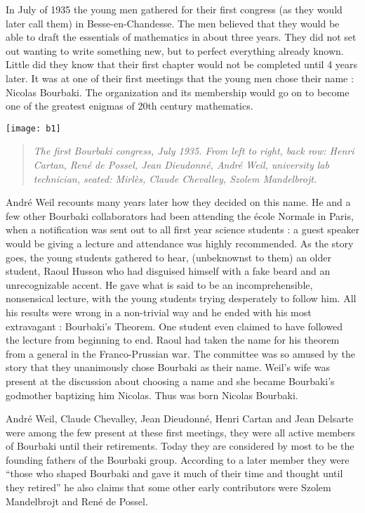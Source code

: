 \documentclass[12pt]{article}
\begin{document}
In July of 1935 the young men gathered for their first congress (as they would 
later call them) in Besse-en-Chandesse. The men believed that they would be 
able to draft the essentials of mathematics in about three years. They did not 
set out wanting to write something new, but to perfect everything already 
known.  Little did they know that their first chapter would not be completed 
until 4 years later. It was at one of their first meetings that the young men 
chose their name : Nicolas Bourbaki. The organization and its membership 
would go on to become one of the greatest enigmas of 20th century mathematics.
\begin{center}
\texttt{[image: b1]}\\
\begin{quote}
\footnotesize\itshape The first Bourbaki congress, July 1935. From left to 
right, back row: Henri Cartan, Ren\'e de Possel, Jean Dieudonn\'e, Andr\'e 
Weil, university lab technician, seated: Mirl\`es, Claude Chevalley, Szolem 
Mandelbrojt.
\end{quote}
\end{center}
Andr\'e Weil recounts many years later how they decided on this name. He and 
a few other Bourbaki collaborators had been attending the \'ecole Normale in 
Paris, when a notification was sent out to all first year science students : 
a guest speaker would be giving a lecture and attendance was highly 
recommended. As the story goes, the young students gathered to hear, 
(unbeknownst to them) an older student, Raoul Husson who had disguised himself 
with a fake beard and an unrecognizable accent. He gave what is said to be an 
incomprehensible, nonsensical lecture, with the young students trying 
desperately to follow him. All his results were wrong in a non-trivial way and 
he ended with his most extravagant : Bourbaki's Theorem. One student even 
claimed to have followed the lecture from beginning to end. Raoul had taken 
the name for his theorem from a general in the Franco-Prussian war. The 
committee was so amused by the story that they unanimously chose Bourbaki 
as their name. Weil's wife was present at the discussion about choosing a 
name and she became Bourbaki's godmother baptizing him Nicolas.\cite{WA}  
Thus was born Nicolas Bourbaki.  

Andr\'e Weil, Claude Chevalley, Jean Dieudonn\'e, Henri Cartan and Jean 
Delsarte were among the few present at these first meetings, they were all 
active members of Bourbaki until their retirements. Today they are 
considered by most to be the founding fathers of the Bourbaki group.  
According to a later member they were ``those who shaped Bourbaki and 
gave it much of their time and thought until they retired'' he also claims 
that some other early contributors were Szolem Mandelbrojt and Ren\'e de 
Possel.\cite{BA}\\
\end{document}
